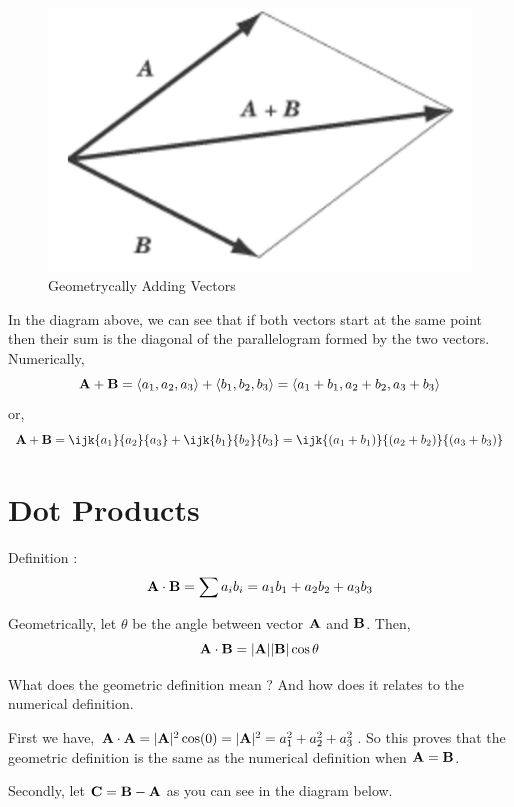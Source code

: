 \begin{figure}[ht!]
	\centering
	\includegraphics[scale=0.5]{./images/lecture_1_figure_1.png}
	\caption{Geometrycally Adding Vectors}
\end{figure}

In the diagram above, we can see that if both vectors start at the same point then their sum is the diagonal of the parallelogram formed by the two vectors.
Numerically, $$ {\bf A} + {\bf B} = \left< a_1, a_2, a_3 \right> + \left< b_1, b_2, b_3 \right> = \left< a_1 + b_1, a_2 + b_2, a_3 + b_3 \right> $$
or,
$$ {\bf A} + {\bf B} = \ijk{a_1}{a_2}{a_3} + \ijk{b_1}{b_2}{b_3} = \ijk{(a_1 + b_1)}{(a_2 + b_2)}{(a_3 + b_3)} $$


\section{Dot Products}

Definition :
$$
{\bf A} \cdot {\bf B} = \sum a_i b_i = a_1 b_1 + a_2 b_2 + a_3 b_3
$$

Geometrically, let $\theta$ be the angle between vector ${\bf A}$ and ${\bf B}$. Then,
$$ {\bf A} \cdot {\bf B} = |{\bf A}||{\bf B}| \cos \theta $$

What does the geometric definition mean ? And how does it relates to the numerical definition.

First we have, ${\bf A} \cdot {\bf A} = |{\bf A}|^2 \cos(0) = |{\bf A}|^2 = a_1^2 + a_2^2 + a_3^2 $.
So this proves that the geometric definition is the same as the numerical definition when ${\bf A} = {\bf B}$.

Secondly, let ${\bf C} = {\bf B} - {\bf A}$ as you can see in the diagram below.

